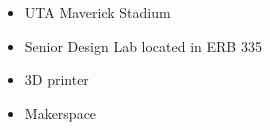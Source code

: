 

\begin{itemize}
  \item UTA Maverick Stadium
  \item Senior Design Lab located in ERB 335
  \item 3D printer
  \item Makerspace
\end{itemize}
